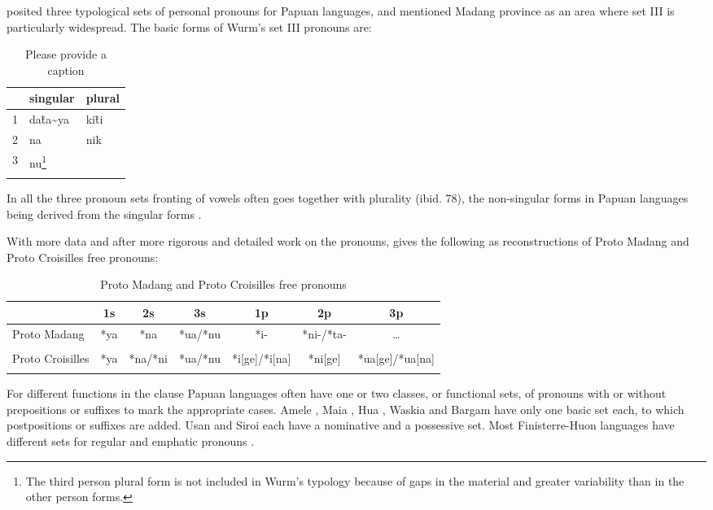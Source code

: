 \citet{Wurm1982} posited three typological sets of personal pronouns for Papuan languages, and mentioned Madang province as an area where set III is particularly widespread. The basic forms of Wurm's set III pronouns are:

\begin{table}
\caption{Please provide a caption}
\label{} 
\begin{tabular}{lll}
\mytoprule
 &singular &plural\\
\midrule
1 &da\~{ta\~{}ya} &ki\~{ti}\\
2 &na &nik\\
3 &nu\footnote{The third person plural form is not included in Wurm's typology because of gaps in the material and greater variability than in the other person forms.} &\citep[40--42]{Wurm1982}\\
\mybottomrule
\end{tabular}
\end{table}


In all the three pronoun sets fronting of vowels often goes together with plurality (ibid. 78), the non-singular forms in Papuan languages being derived from the singular forms \citep[361]{Franklin1979}. 

With more data and after more rigorous and detailed work on the  pronouns, \citet[5]{Ross1995} gives the following as reconstructions of Proto Madang and Proto Croisilles free pronouns:

\begin{table}
\begin{tabular}{lcccccc}
\mytoprule
 & 1s & 2s & 3s & 1p & 2p & 3p\\ 
\midrule
\midrule
\parbox{1.1cm}{Proto Madang} & *ya & *na & *ua/*nu & *i- & *ni-/*ta- & {\dots}\\ 
\\
\parbox{1.1cm}{Proto Croisilles} & *ya & *na/*ni & *ua/*nu & *i[ge]/*i[na] & *ni[ge] & *ua[ge]/*ua[na]\\
\mybottomrule
\mybottomrule
\end{tabular}
\caption{Proto Madang and Proto Croisilles free pronouns}
\label{tab:8}
\end{table}

For different functions in the clause Papuan languages often have one or two classes, or functional sets, of pronouns with or without prepositions or suffixes to mark the appropriate cases. Amele \citep{Roberts1987}, Maia \citep[71]{Hardin2002}, Hua \citep[215]{Haiman1980}, Waskia \citep[53]{RossEtAl1978}%
 and Bargam \citep[29]{Hepner2002} have only one basic set each, to which postpositions or suffixes are added. Usan \citep{Reesink1987} and Siroi \citep{Wells1979} each have a nominative and a possessive set. Most Finisterre-Huon languages have different sets for regular and emphatic pronouns \citep{McElhanon1973}.

